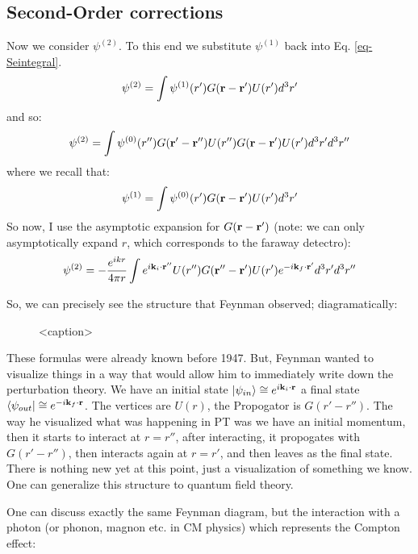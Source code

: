 \subsection{Second-Order corrections}
Now we consider $\psi^{(2)}$. To this end we substitute $\psi^{(1)}$ back into Eq. \eqref{eq-Seintegral}.
\begin{equation}
    \psi^{(2)} = \int \psi^{(1)}(r')G(\mathbf{r} - \mathbf{r}')U(r')d^3r'
\end{equation}
and so:
\begin{equation}
    \psi^{(2)} = \int \psi^{(0)}(r'') G(\mathbf{r}' - \mathbf{r}'') U(r'')G(\mathbf{r} - \mathbf{r}')U(r')d^3r' d^3r''
\end{equation}
where we recall that:
\begin{equation}
    \psi^{(1)} = \int \psi^{(0)}(r')G(\mathbf{r} - \mathbf{r}')U(r')d^3r'
\end{equation}
So now, I use the asymptotic expansion for $G(\mathbf{r} - \mathbf{r}')$ (note: we can only asymptotically expand $r$, which corresponds to the faraway detectro):
\begin{equation}
    \psi^{(2)} = -\frac{e^{ikr}}{4\pi r}\int e^{i\mathbf{k}_i \cdot \mathbf{r}''} U(r'')G(\mathbf{r}'' - \mathbf{r}')U(r') e^{-i\mathbf{k}_f \cdot \mathbf{r}'} d^3r' d^3r''
\end{equation}

So, we can precisely see the structure that Feynman observed; diagramatically:

\begin{figure}[htbp]
    \centering
    
    \caption{<caption>}
    \label{<label>}
\end{figure}

These formulas were already known before 1947. But, Feynman wanted to visualize things in a way that would allow him to immediately write down the perturbation theory. We have an initial state $\lvert \psi_{in} \rangle \cong e^{i\mathbf{k}_i \cdot \mathbf{r}}$ a final state $\langle \psi_{out} \rvert \cong e^{-i\mathbf{k}_f \cdot \mathbf{r}}$. The vertices are $U(r)$, the Propogator is $G(r' - r'')$. The way he visualized what was happening in PT was we have an initial momentum, then it starts to interact at $r = r''$, after interacting, it propogates with $G(r' - r'')$, then interacts again at $r = r'$, and then leaves as the final state. There is nothing new yet at this point, just a visualization of something we know. One can generalize this structure to quantum field theory.

One can discuss exactly the same Feynman diagram, but the interaction with a photon (or phonon, magnon etc. in CM physics) which represents the Compton effect:

